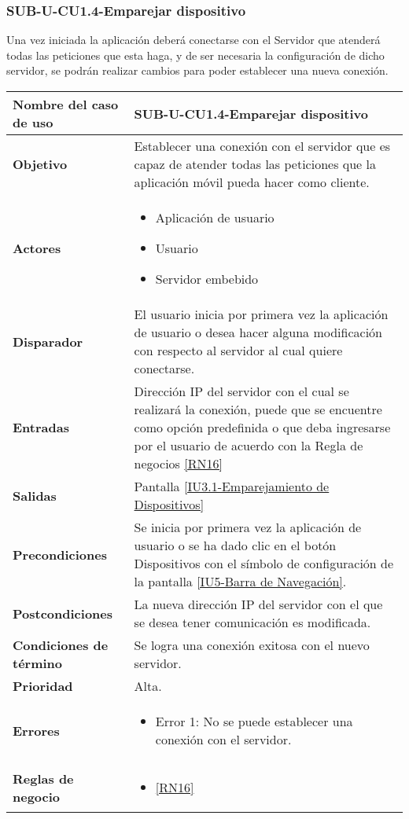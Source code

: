 \subsubsection{SUB-U-CU1.4-Emparejar dispositivo}\label{SUB-U-CU1.4}
Una vez iniciada la aplicación deberá conectarse con el Servidor que atenderá todas las peticiones que esta haga, y de ser necesaria la configuración de dicho servidor, se podrán realizar cambios para poder establecer una nueva conexión.
\begin{longtable}{|J{5cm}|J{10.3cm}|}
	\hline
	\textbf{Nombre del caso de uso} &
		SUB-U-CU1.4-Emparejar dispositivo \\ \hline
	\textbf{Objetivo} &
		Establecer una conexión con el servidor que es capaz de atender todas las peticiones que la aplicación móvil pueda hacer como cliente. \\ \hline
	\textbf{Actores} &
	    \begin{itemize}
			\item Aplicación de usuario
			\item Usuario
		    \item Servidor embebido
		\end{itemize}\\ \hline 
	\textbf{Disparador} & 
		El usuario inicia por primera vez la aplicación de usuario o desea hacer alguna modificación con respecto al servidor al cual quiere conectarse. \\ \hline 
	\textbf{Entradas} & 
		Dirección IP del servidor con el cual se realizará la conexión, puede que se encuentre como opción predefinida o que deba ingresarse por el usuario de acuerdo con la Regla de negocios \ref{RN16}\\ \hline 
	\textbf{Salidas} & 
		Pantalla \hyperref[fig:Emparejamiento Dispositivos]{[IU3.1-Emparejamiento de Dispositivos]} \\ \hline
	\textbf{Precondiciones} &
		Se inicia por primera vez la aplicación de usuario o se ha dado clic en el botón Dispositivos con el símbolo de configuración de la pantalla \hyperref[fig:Barra de navegacion]{[IU5-Barra de Navegación]}.\\ \hline 
	\textbf{Postcondiciones} &
		La nueva dirección IP del servidor con el que se desea tener comunicación es modificada.\\ \hline 
	\textbf{Condiciones de término} & 
		Se logra una conexión exitosa con el nuevo servidor. \\ \hline
	\textbf{Prioridad} & 
		Alta. \\ \hline
	\textbf{Errores} & 
		\begin{itemize}
			\item \label{SUB-U-CU1.4:Error1} Error 1: No se puede establecer una conexión con el servidor.
		\end{itemize} \\ \hline
	\textbf{Reglas de negocio} & 
	    \begin{itemize}
		    \item \ref{RN16}
		\end{itemize} \\ \hline
\end{longtable}

